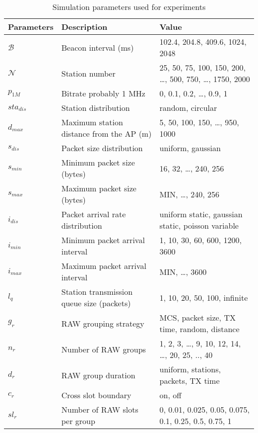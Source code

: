 \begin{table*}[t]
\centering
\renewcommand{\arraystretch}{1.2}
\caption{Simulation parameters used for experiments\label{tab:ns3 parameters}}
\begin{tabular}{lll}
\hline
\textbf{Parameters}  & \textbf{Description}            		 & \textbf{Value}  \\
\hline
 $\mathcal{B}$ & Beacon interval (ms)            		        & 102.4, 204.8, 409.6, 1024, 2048  \\
 $\mathcal{N}$ & Station number              		        & 25, 50, 75, 100, 150, 200, …, 500, 750, …, 1750, 2000    \\
 $p_\textit{1M}$  & Bitrate probably 1 MHz                      & 0, 0.1, 0.2, …, 0.9, 1      \\  
 $sta_\textit{dis}$ & Station distribution         				& random, circular \\
 $d_\textit{max}$ & Maximum station distance from the AP (m)       & 5, 50, 100, 150, …, 950, 1000 \\
 $s_\textit{dis}$ & Packet size distribution          & uniform, gaussian  \\
 $s_\textit{min}$ & Minimum packet size (bytes)       & 16, 32, …, 240, 256   \\
 $s_\textit{max}$ & Maximum packet size (bytes)       & MIN, …, 240, 256  \\
 $i_\textit{dis}$ & Packet arrival rate distribution  & uniform static, gaussian static, poisson variable\\
 $i_\textit{min}$ & Minimum packet arrival interval   & 1, 10, 30, 60, 600, 1200, 3600   \\
 $i_\textit{max}$ & Maximum packet arrival interval   & MIN, …, 3600  \\
 $l_q$ & Station transmission queue size (packets)   & 1, 10, 20, 50, 100, infinite   \\
 $g_r$ & RAW grouping strategy             & MCS, packet size, TX time, random, distance \\
 $n_r$ & Number of RAW groups              & 1, 2, 3, …, 9, 10, 12, 14, …, 20, 25, .., 40  \\
 $d_r$ & RAW group duration                & uniform, stations, packets, TX time  \\
 $c_r$ & Cross slot boundary               & on, off \\
 $\textit{sl}_r$ & Number of RAW slots per group     & 0, 0.01, 0.025, 0.05, 0.075, 0.1, 0.25, 0.5, 0.75, 1 \\

\hline
\end{tabular}
\end{table*}

